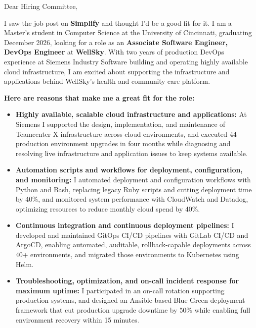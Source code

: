 \documentclass[11pt]{letter}
\date{}
\begin{document}
\begin{letter}{}

\opening{Dear Hiring Committee,}

I saw the job post on \textbf{Simplify} and thought I'd be a good fit for it. I am a Master's student in Computer Science at the University of Cincinnati, graduating December 2026, looking for a role as an \textbf{Associate Software Engineer, DevOps Engineer} at \textbf{WellSky}. With two years of production DevOps experience at Siemens Industry Software building and operating highly available cloud infrastructure, I am excited about supporting the infrastructure and applications behind WellSky's health and community care platform.

\textbf{Here are reasons that make me a great fit for the role:}

\begin{itemize}[leftmargin=*, itemsep=0.45em]
    \item \textbf{Highly available, scalable cloud infrastructure and applications:} At Siemens I supported the design, implementation, and maintenance of Teamcenter X infrastructure across cloud environments, and executed 44 production environment upgrades in four months while diagnosing and resolving live infrastructure and application issues to keep systems available.

    \item \textbf{Automation scripts and workflows for deployment, configuration, and monitoring:} I automated deployment and configuration workflows with Python and Bash, replacing legacy Ruby scripts and cutting deployment time by 40\%, and monitored system performance with CloudWatch and Datadog, optimizing resources to reduce monthly cloud spend by 40\%.

    \item \textbf{Continuous integration and continuous deployment pipelines:} I developed and maintained GitOps CI/CD pipelines with GitLab CI/CD and ArgoCD, enabling automated, auditable, rollback-capable deployments across 40+ environments, and migrated those environments to Kubernetes using Helm.

    \item \textbf{Troubleshooting, optimization, and on-call incident response for maximum uptime:} I participated in an on-call rotation supporting production systems, and designed an Ansible-based Blue-Green deployment framework that cut production upgrade downtime by 50\% while enabling full environment recovery within 15 minutes.


\end{itemize}
\end{letter}
\end{document}
